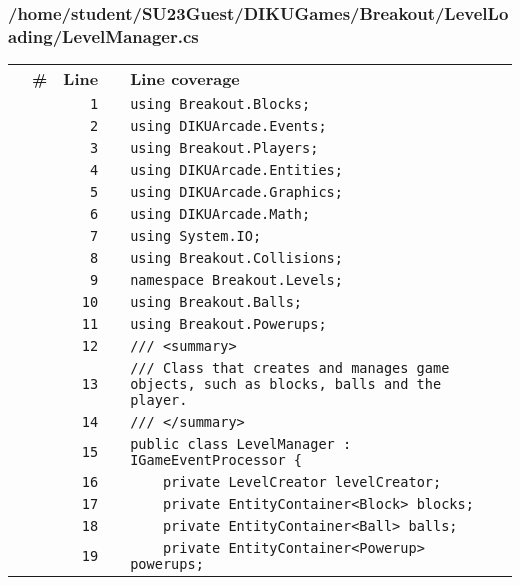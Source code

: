 \documentclass[a4paper,landscape,10pt]{article}
\begin{document}
\subsubsection{/home/student/SU23Guest/DIKUGames/Breakout/LevelLoading/LevelManager.cs}
\begin{longtable}[l]{lrrll}
\textbf{} & \textbf{\#} & \textbf{Line} & \textbf{} & \textbf{Line coverage}\\
\cellcolor{gray} &  & \verb~1~ & & \verb~using Breakout.Blocks;~\\
\cellcolor{gray} &  & \verb~2~ & & \verb~using DIKUArcade.Events;~\\
\cellcolor{gray} &  & \verb~3~ & & \verb~using Breakout.Players;~\\
\cellcolor{gray} &  & \verb~4~ & & \verb~using DIKUArcade.Entities;~\\
\cellcolor{gray} &  & \verb~5~ & & \verb~using DIKUArcade.Graphics;~\\
\cellcolor{gray} &  & \verb~6~ & & \verb~using DIKUArcade.Math;~\\
\cellcolor{gray} &  & \verb~7~ & & \verb~using System.IO;~\\
\cellcolor{gray} &  & \verb~8~ & & \verb~using Breakout.Collisions;~\\
\cellcolor{gray} &  & \verb~9~ & & \verb~namespace Breakout.Levels;~\\
\cellcolor{gray} &  & \verb~10~ & & \verb~using Breakout.Balls;~\\
\cellcolor{gray} &  & \verb~11~ & & \verb~using Breakout.Powerups;~\\
\cellcolor{gray} &  & \verb~12~ & & \verb~/// <summary>~\\
\cellcolor{gray} &  & \verb~13~ & & \verb~/// Class that creates and manages game objects, such as blocks, balls and the player.~\\
\cellcolor{gray} &  & \verb~14~ & & \verb~/// </summary>~\\
\cellcolor{gray} &  & \verb~15~ & & \verb~public class LevelManager : IGameEventProcessor {~\\
\cellcolor{gray} &  & \verb~16~ & & \verb~    private LevelCreator levelCreator;~\\
\cellcolor{gray} &  & \verb~17~ & & \verb~    private EntityContainer<Block> blocks;~\\
\cellcolor{gray} &  & \verb~18~ & & \verb~    private EntityContainer<Ball> balls;~\\
\cellcolor{gray} &  & \verb~19~ & & \verb~    private EntityContainer<Powerup> powerups;~\\

\end{longtable}
\end{document}
